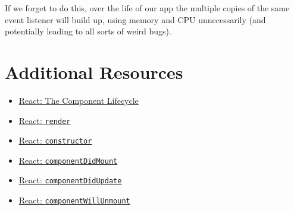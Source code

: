 If we forget to do this, over the life of our app the multiple copies of the same event listener will build up, using memory and CPU unnecessarily (and potentially leading to all sorts of weird bugs).



\section{Additional Resources}

\begin{itemize}[leftmargin=*]
    \item \href{https://reactjs.org/docs/react-component.html#the-component-lifecycle}{React: The Component Lifecycle}
    \item \href{https://reactjs.org/docs/react-component.html#render}{React: \texttt{render}}
    \item \href{https://reactjs.org/docs/react-component.html#constructor}{React: \texttt{constructor}}
    \item \href{https://reactjs.org/docs/react-component.html#componentdidmount}{React: \texttt{componentDidMount}}
    \item \href{https://reactjs.org/docs/react-component.html#componentdidupdate}{React: \texttt{componentDidUpdate}}
    \item \href{https://reactjs.org/docs/react-component.html#componentwillunmount}{React: \texttt{componentWillUnmount}}
\end{itemize}
